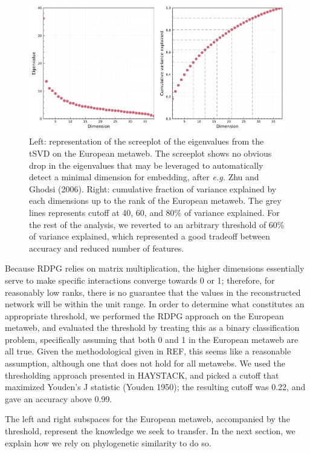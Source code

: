 \documentclass[10pt,oneside]{article}
\makeatletter
\def\maxwidth{\ifdim\Gin@nat@width>\linewidth\linewidth
\else\Gin@nat@width\fi}
\let\Oldincludegraphics\includegraphics
\renewcommand{\includegraphics}[1]{\Oldincludegraphics[width=\maxwidth]{#1}}
\makeatother
\begin{document}
\begin{figure}
\hypertarget{fig:scree}{%
\centering
\includegraphics{figures/figure-screeplot.png}
\caption{Left: representation of the screeplot of the eigenvalues from
the tSVD on the European metaweb. The screeplot shows no obvious drop in
the eigenvalues that may be leveraged to automatically detect a minimal
dimension for embedding, after \emph{e.g.} Zhu and Ghodsi (2006). Right:
cumulative fraction of variance explained by each dimensions up to the
rank of the European metaweb. The grey lines represents cutoff at 40,
60, and 80\% of variance explained. For the rest of the analysis, we
reverted to an arbitrary threshold of 60\% of variance explained, which
represented a good tradeoff between accuracy and reduced number of
features.}\label{fig:scree}
}
\end{figure}

Because RDPG relies on matrix multiplication, the higher dimensions
essentially serve to make specific interactions converge towards 0 or 1;
therefore, for reasonably low ranks, there is no guarantee that the
values in the reconstructed network will be within the unit range. In
order to determine what constitutes an appropriate threshold, we
performed the RDPG approach on the European metaweb, and evaluated the
threshold by treating this as a binary classification problem,
specifically assuming that both 0 and 1 in the European metaweb are all
true. Given the methodological given in REF, this seems like a
reasonable assumption, although one that does not hold for all metawebs.
We used the thresholding approach presented in HAYSTACK, and picked a
cutoff that maximized Youden's J statistic (Youden 1950); the resulting
cutoff was 0.22, and gave an accuracy above 0.99.

The left and right subspaces for the European metaweb, accompanied by
the threshold, represent the knowledge we seek to transfer. In the next
section, we explain how we rely on phylogenetic similarity to do so.
\end{document}
